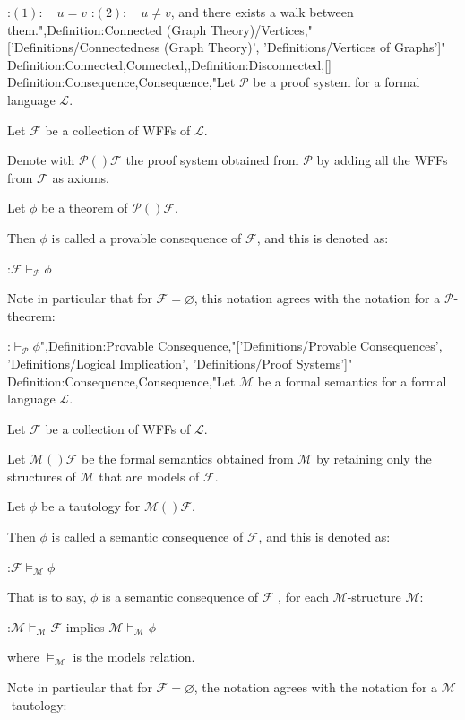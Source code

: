 :$(1): \quad u = v$
:$(2): \quad u \ne v$, and there exists a walk between them.",Definition:Connected (Graph Theory)/Vertices,"['Definitions/Connectedness (Graph Theory)', 'Definitions/Vertices of Graphs']"
Definition:Connected,Connected,,Definition:Disconnected,[]
Definition:Consequence,Consequence,"Let $\mathscr P$ be a proof system for a formal language $\mathcal L$.

Let $\mathcal F$ be a collection of WFFs of $\mathcal L$.


Denote with $\mathscr P \left(   \right)\mathcal F$ the proof system obtained from $\mathscr P$ by adding all the WFFs from $\mathcal F$ as axioms.

Let $\phi$ be a theorem of $\mathscr P \left(   \right)\mathcal F$.


Then $\phi$ is called a provable consequence of $\mathcal F$, and this is denoted as:

:$\mathcal F \vdash_{\mathscr P} \phi$


Note in particular that for $\mathcal F = \varnothing$, this notation agrees with the notation for a $\mathscr P$-theorem:

:$\vdash_{\mathscr P} \phi$",Definition:Provable Consequence,"['Definitions/Provable Consequences', 'Definitions/Logical Implication', 'Definitions/Proof Systems']"
Definition:Consequence,Consequence,"Let $\mathscr M$ be a formal semantics for a formal language $\mathcal L$.

Let $\mathcal F$ be a collection of WFFs of $\mathcal L$.


Let $\mathscr M \left(   \right)\mathcal F$ be the formal semantics obtained from $\mathscr M$ by retaining only the structures of $\mathscr M$ that are models of $\mathcal F$.

Let $\phi$ be a tautology for $\mathscr M \left(   \right)\mathcal F$.


Then $\phi$ is called a semantic consequence of $\mathcal F$, and this is denoted as:

:$\mathcal F \models_{\mathscr M} \phi$


That is to say, $\phi$ is a semantic consequence of $\mathcal F$ , for each $\mathscr M$-structure $\mathcal M$:

:$\mathcal M \models_{\mathscr M} \mathcal F$ implies $\mathcal M \models_{\mathscr M} \phi$

where $\models_{\mathscr M}$ is the models relation.


Note in particular that for $\mathcal F = \varnothing$, the notation agrees with the notation for a $\mathscr M$-tautology:

